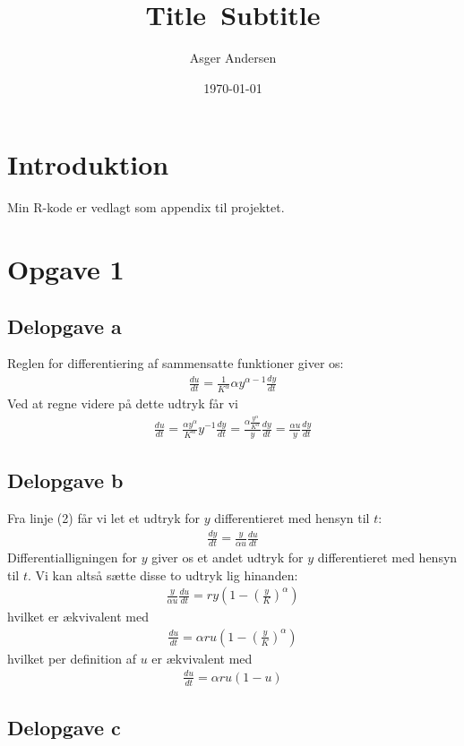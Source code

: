 \documentclass[12pt]{article}
\title{
  Title\
  \large Subtitle
}
\author{Asger Andersen}
\date{\today}
\begin{document}
\section{Introduktion}

Min R-kode er vedlagt som appendix til projektet.

\section{Opgave 1}

\subsection{Delopgave a}

Reglen for differentiering af sammensatte funktioner giver os:
\begin{align}
\frac{du}{dt}=\frac{1}{K^\alpha}\alpha y^{\alpha-1} \frac{dy}{dt}
\end{align}
Ved at regne videre på dette udtryk får vi
\begin{align}
 \frac{du}{dt} = \frac{\alpha y^\alpha}{K^\alpha} y^{-1} \frac{dy}{dt} = \frac{\alpha \frac{y^\alpha}{K^\alpha}}{y} \frac{dy}{dt} = \frac{\alpha u}{y} \frac{dy}{dt}
\end{align}

\subsection{Delopgave b}

Fra linje (2) får vi let et udtryk for $y$ differentieret med hensyn til $t$:
\begin{align}
 \frac{dy}{dt} = \frac{y}{\alpha u} \frac{du}{dt}
\end{align}
Differentialligningen for $y$ giver os et andet udtryk for $y$ differentieret med hensyn til $t$. Vi kan altså sætte disse to udtryk lig hinanden:
\begin{align}
\frac{y}{\alpha u} \frac{du}{dt} = ry\left(1-\left(\frac{y}{K}\right)^\alpha\right)
\end{align}
hvilket er ækvivalent med
\begin{align}
 \frac{du}{dt} = \alpha r u \left(1-\left(\frac{y}{K}\right)^\alpha\right)
\end{align}
hvilket per definition af $u$ er ækvivalent med
\begin{align}
 \frac{du}{dt} = \alpha r u \left(1-u\right)
\end{align}

\subsection{Delopgave c}
\end{document}
